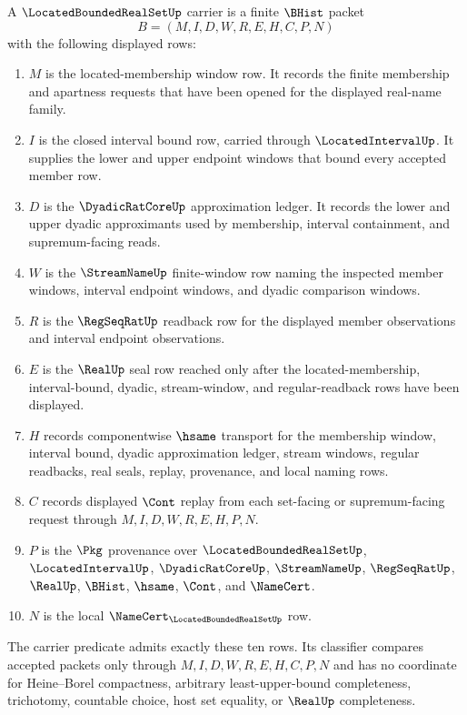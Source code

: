 \begin{definition}
\label{def:located-bounded-real-set-carrier}
A $\LocatedBoundedRealSetUp$ carrier is a finite $\BHist$ packet
$$
B=(M,I,D,W,R,E,H,C,P,N)
$$
with the following displayed rows:
\begin{enumerate}
\item $M$ is the located-membership window row. It records the finite membership and apartness requests that have been opened for the displayed real-name family.
\item $I$ is the closed interval bound row, carried through $\LocatedIntervalUp$. It supplies the lower and upper endpoint windows that bound every accepted member row.
\item $D$ is the $\DyadicRatCoreUp$ approximation ledger. It records the lower and upper dyadic approximants used by membership, interval containment, and supremum-facing reads.
\item $W$ is the $\StreamNameUp$ finite-window row naming the inspected member windows, interval endpoint windows, and dyadic comparison windows.
\item $R$ is the $\RegSeqRatUp$ readback row for the displayed member observations and interval endpoint observations.
\item $E$ is the $\RealUp$ seal row reached only after the located-membership, interval-bound, dyadic, stream-window, and regular-readback rows have been displayed.
\item $H$ records componentwise $\hsame$ transport for the membership window, interval bound, dyadic approximation ledger, stream windows, regular readbacks, real seals, replay, provenance, and local naming rows.
\item $C$ records displayed $\Cont$ replay from each set-facing or supremum-facing request through $M,I,D,W,R,E,H,P,N$.
\item $P$ is the $\Pkg$ provenance over $\LocatedBoundedRealSetUp$, $\LocatedIntervalUp$, $\DyadicRatCoreUp$, $\StreamNameUp$, $\RegSeqRatUp$, $\RealUp$, $\BHist$, $\hsame$, $\Cont$, and $\NameCert$.
\item $N$ is the local $\NameCert_{\LocatedBoundedRealSetUp}$ row.
\end{enumerate}
The carrier predicate admits exactly these ten rows. Its classifier compares accepted packets only through $M,I,D,W,R,E,H,C,P,N$ and has no coordinate for Heine--Borel compactness, arbitrary least-upper-bound completeness, trichotomy, countable choice, host set equality, or $\RealUp$ completeness.
\end{definition}

